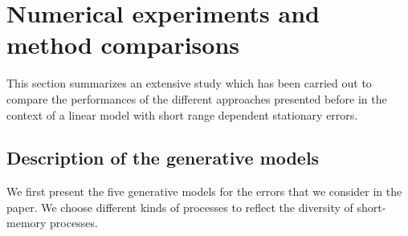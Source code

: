 \section{Numerical experiments and method comparisons}
\label{sec:simu}

This section summarizes an extensive study which has been carried out to compare the performances of the different approaches presented before in the context of a linear model with short range dependent stationary errors.

\subsection{Description of the generative models}
\label{sub:genmodels}

We first present the five generative models for the errors that we consider in the paper. We choose different kinds of processes to reflect the diversity of short-memory processes.

